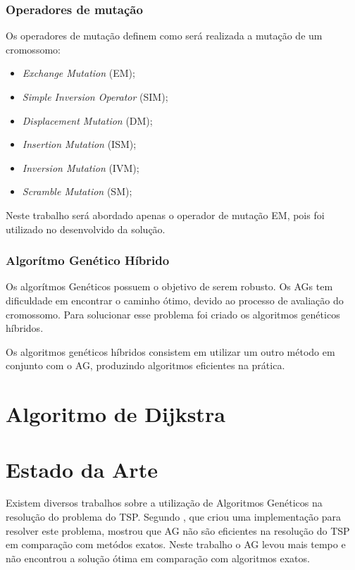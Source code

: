 \documentclass{abnt}
\begin{document}
		\subsection{Operadores de mutação}

			Os operadores de mutação definem como será realizada a mutação de um cromossomo\cite{0012-pdf}:

			\begin{itemize}
				\item \textit{Exchange Mutation} (EM);
				\item \textit{Simple Inversion Operator} (SIM);
				\item \textit{Displacement Mutation} (DM);
				\item \textit{Insertion Mutation} (ISM);
				\item \textit{Inversion Mutation} (IVM);
				\item \textit{Scramble Mutation} (SM);
			\end{itemize}

			Neste trabalho será abordado apenas o operador de mutação EM, pois foi utilizado no desenvolvido da solução.


		\subsection{Algorítmo Genético Híbrido}

			Os algorítmos  Genéticos possuem o objetivo de serem robusto. Os AGs tem dificuldade em encontrar o caminho ótimo, devido ao processo de avaliação do cromossomo. 
			Para solucionar esse problema foi criado os algoritmos genéticos híbridos.

			Os algoritmos genéticos híbridos consistem em utilizar um outro método em conjunto com o AG, produzindo algoritmos eficientes na prática.

		\chapter{Algoritmo de Dijkstra}

			

		\chapter{Estado da Arte}
		
			Existem diversos trabalhos sobre a utilização de Algoritmos Genéticos na resolução do problema do TSP.
			Segundo \cite{0005-pdf}, que criou uma implementação para resolver este problema, mostrou que AG não são eficientes 
			na resolução do TSP em comparação com metódos exatos. Neste trabalho o AG levou mais tempo e não encontrou a solução ótima em comparação com 
			algoritmos exatos.
\end{document}
